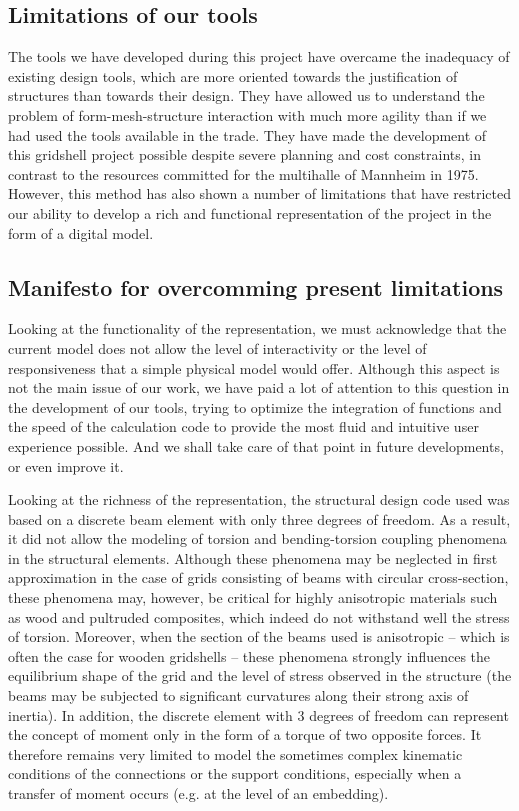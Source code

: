 \subsection*{Limitations of our tools}

The tools we have developed during this project have overcame the inadequacy of existing design tools, which are more oriented towards the justification of structures than towards their design. They have allowed us to understand the problem of form-mesh-structure interaction with much more agility than if we had used the tools available in the trade. They have made the development of this gridshell project possible despite severe planning and cost constraints, in contrast to the resources committed for the multihalle of Mannheim in 1975. However, this method has also shown a number of limitations that have restricted our ability to develop a rich and functional representation of the project in the form of a digital model.

\subsection*{Manifesto for overcomming present limitations}

Looking at the functionality of the representation, we must acknowledge that the current model does not allow the level of interactivity or the level of responsiveness that a simple physical model would offer. Although this aspect is not the main issue of our work, we have paid a lot of attention to this question in the development of our tools, trying to optimize the integration of functions and the speed of the calculation code to provide the most fluid and intuitive user experience possible. And we shall take care of that point in future developments, or even improve it.

Looking at the richness of the representation, the structural design code used was based on a discrete beam element with only three degrees of freedom. As a result, it did not allow the modeling of torsion and bending-torsion coupling phenomena in the structural elements. Although these phenomena may be neglected in first approximation in the case of grids consisting of beams with circular cross-section, these phenomena may, however, be critical for highly anisotropic materials such as wood and pultruded composites, which indeed do not withstand well the stress of torsion. Moreover, when the section of the beams used is anisotropic -- which is often the case for wooden gridshells -- these phenomena strongly influences the equilibrium shape of the grid and the level of stress observed in the structure (the beams may be subjected to significant curvatures along their strong axis of inertia). In addition, the discrete element with 3 degrees of freedom can represent the concept of moment only in the form of a torque of two opposite forces. It therefore remains very limited to model the sometimes complex kinematic conditions of the connections or the support conditions, especially when a transfer of moment occurs (e.g. at the level of an embedding).

